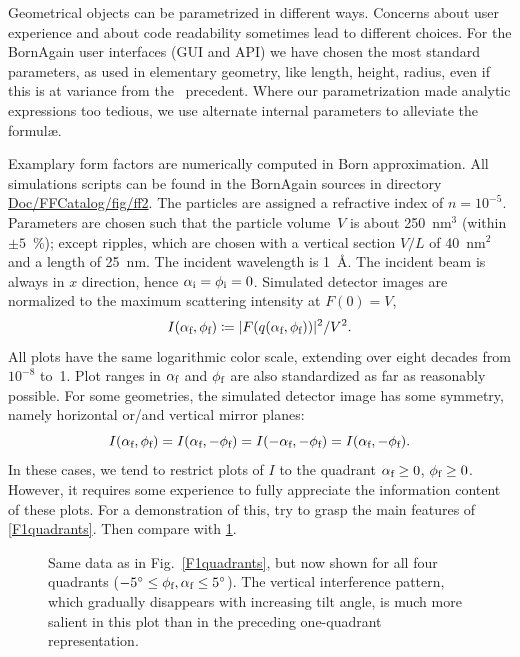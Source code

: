 Geometrical objects can be parametrized in different ways.
Concerns about user experience and about code readability
sometimes lead to different choices.
For the BornAgain user interfaces (GUI and API)
we have chosen the most standard parameters,
as used in elementary geometry, like length, height, radius,
even if this is at variance from the \IsGISAXS\ precedent.
Where our parametrization made analytic expressions too tedious,
we use alternate internal parameters to alleviate the formul\ae.

Examplary form factors are numerically computed in Born approximation.
All simulations scripts can be found in the BornAgain sources in directory
\href{https://github.com/scgmlz/BornAgain/tree/master/Doc/FFCatalog/fig/ff2}%
{Doc/FFCatalog/fig/ff2}.
The particles are assigned a refractive index of $n=10^{-5}$.
%
Parameters are chosen such that
the particle volume~$V$
%
is about 250~nm$^3$ (within $\pm5$~\%);
except ripples, which are chosen with a vertical section $V/L$ of 40~nm$^2$
and a length of 25~nm.
The incident wavelength is 1~\AA.
The incident beam is always in $x$ direction, hence $\alpha_\si=\phi_\si=0$.
Simulated detector images are normalized to the maximum scattering intensity at $F(0)=V$,
\begin{equation}
  I(\alpha_\sf,\phi_\sf)\coloneqq |F(q(\alpha_\sf,\phi_\sf))|^2/V^2.
\end{equation}
All plots
%
have the same logarithmic color scale,
extending over eight decades from $10^{-8}$ to~1.
Plot ranges in $\alpha_\sf$ and $\phi_\sf$ are also standardized as far as
reasonably possible.
For some geometries,
the simulated detector image has some symmetry,
namely horizontal or/and vertical mirror planes:
\begin{equation}\label{EFq4sym}
  I(\alpha_\sf,\phi_\sf)
  = I(\alpha_\sf,-\phi_\sf)
  = I(-\alpha_\sf,-\phi_\sf)
  = I(\alpha_\sf,-\phi_\sf).
\end{equation}
In these cases, we tend to restrict
plots of $I$ to the quadrant $\alpha_\sf\ge0$, $\phi_\sf\ge0$.
However, it requires some experience to fully appreciate the
information content of these plots.
For a demonstration of this,
try to grasp the main features of \cref{F1quadrants}.
Then compare with \cref{F4quadrants}.

\begin{figure}[t]
\begin{center}
\end{center}
\caption{Same data as in Fig.~\protect\ref{F1quadrants},
but now shown for all four quadrants ($-5^\circ\le\phi_\sf,\alpha_\sf\le 5^\circ$).
The vertical interference pattern,
which gradually disappears with increasing tilt angle,
 is much more salient in this plot
than in the preceding one-quadrant representation.}
\label{F4quadrants}
\end{figure}

